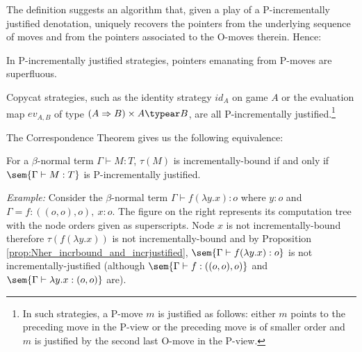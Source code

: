 The definition suggests an algorithm that, given a play of a
P-incrementally justified denotation, uniquely recovers the pointers
from the underlying sequence of moves and from the pointers
associated to the O-moves therein. Hence:
\begin{lemma}
\label{lem:incrjustified_pointers_uniqu_recover} In P-incrementally
justified strategies, pointers emanating from P-moves are
superfluous.
\end{lemma}

\begin{example}
Copycat strategies, such as the identity strategy $id_A$ on game $A$
or the evaluation map $ev_{A,B}$ of type $(A \Rightarrow B) \times A
\typear B$, are all P-incrementally justified.\footnote{In such
strategies, a P-move $m$ is justified as follows: either $m$ points
to the preceding move in the P-view or the preceding move is of
smaller order and $m$ is justified by the second last O-move in the
P-view.}
\end{example}
%




The Correspondence Theorem
gives us the following equivalence:
\begin{proposition} %
\label{prop:Nher_incrbound_and_incrjustified} For a $\beta$-normal
term $\Gamma \vdash M : T$, $\tau(M)$ is incrementally-bound if and
only if $\sem{\Gamma \vdash M : T}$ is P-incrementally justified.
\end{proposition}


\noindent \emph{Example:} %
Consider the $\beta$-normal term $\Gamma\vdash f (\lambda y .x) : o$
where $y:o$ and $\Gamma =f:((o,o),o),~x:o$. The figure on the right
represents its computation tree with the node orders given as
superscripts.  Node $x$ is not incrementally-bound therefore $\tau(f
(\lambda y .x))$ is not incrementally-bound and by Proposition
\ref{prop:Nher_incrbound_and_incrjustified}, $\sem{\Gamma \vdash f
(\lambda y .x) : o}$ is not incrementally-justified (although
$\sem{\Gamma \vdash f : ((o,o),o)}$ and $\sem{\Gamma \vdash \lambda
  y. x : (o,o)}$ are).
\smallskip

